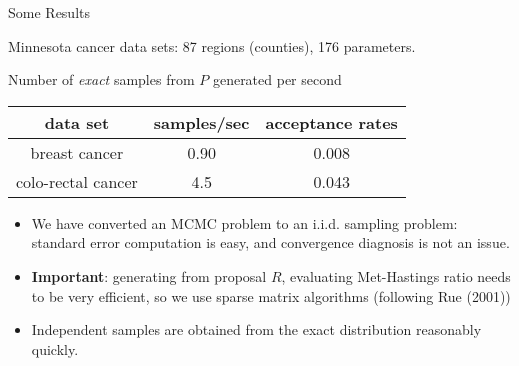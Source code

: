 \documentclass{report}
\newcommand{\head}[1]
{
  \begin{center}
      {\huge {\color{blue} #1}}
    \end{center}
  }
\begin{document}
{\newpage \head{Some Results}
Minnesota cancer data sets: 87 regions (counties), 176 parameters. 
{\LARGE
 \begin{center}
   Number of {\it exact} samples from $P$ generated per second
 \end{center}
\vspace{0.05in}
\begin{center}
  \begin{tabular}{|c|c|c|}
    \hline
    data set
    & samples/sec & acceptance rates\\
    \hline
    breast cancer      & 0.90 & 0.008\\
    colo-rectal cancer & 4.5 & 0.043\\
    \hline
  \end{tabular}
\end{center}
\vspace{0.5in}
} 
\begin{itemize}
\item  We have converted an MCMC problem to an i.i.d. sampling problem: standard error computation is easy, and convergence diagnosis is not an issue.
\item {\bf Important}: generating from proposal $R$, evaluating Met-Hastings ratio needs to be very efficient, so we use sparse matrix algorithms (following Rue (2001))
\item Independent samples are obtained from the exact distribution reasonably quickly.

\end{itemize}}
\end{document}
